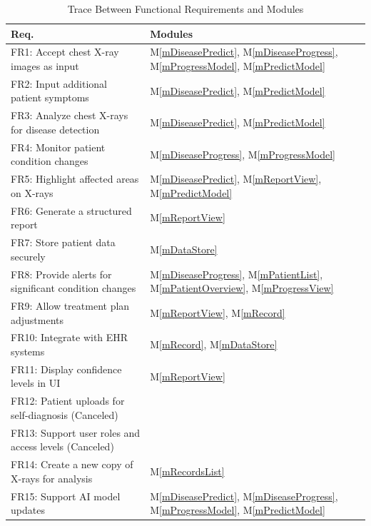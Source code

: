 \documentclass[12pt, titlepage]{article}
\newcommand{\mref}[1]{M\ref{#1}}
\begin{document}
\begin{table}[H]
\centering
\begin{tabular}{p{} p{}}
\toprule
\textbf{Req.} & \textbf{Modules}\\
\midrule
FR1: Accept chest X-ray images as input & \mref{mDiseasePredict}, \mref{mDiseaseProgress}, \mref{mProgressModel}, \mref{mPredictModel}\\
FR2: Input additional patient symptoms & \mref{mDiseasePredict}, \mref{mPredictModel}\\
FR3: Analyze chest X-rays for disease detection & \mref{mDiseasePredict}, \mref{mPredictModel}\\
FR4: Monitor patient condition changes & \mref{mDiseaseProgress}, \mref{mProgressModel}\\
FR5: Highlight affected areas on X-rays & \mref{mDiseasePredict}, \mref{mReportView}, \mref{mPredictModel}\\
FR6: Generate a structured report & \mref{mReportView}\\
FR7: Store patient data securely & \mref{mDataStore}\\
FR8: Provide alerts for significant condition changes & \mref{mDiseaseProgress}, \mref{mPatientList}, \mref{mPatientOverview}, \mref{mProgressView}\\
FR9: Allow treatment plan adjustments & \mref{mReportView}, \mref{mRecord}\\
FR10: Integrate with EHR systems & \mref{mRecord}, \mref{mDataStore}\\
FR11: Display confidence levels in UI & \mref{mReportView}\\
FR12: Patient uploads for self-diagnosis (Canceled) & \\
FR13: Support user roles and access levels (Canceled) & \\
FR14: Create a new copy of X-rays for analysis & \mref{mRecordsList}\\
FR15: Support AI model updates & \mref{mDiseasePredict}, \mref{mDiseaseProgress}, \mref{mProgressModel}, \mref{mPredictModel}\\
\bottomrule
\end{tabular}
\caption{Trace Between Functional Requirements and Modules}
\label{TblRT}
\end{table}
\end{document}
